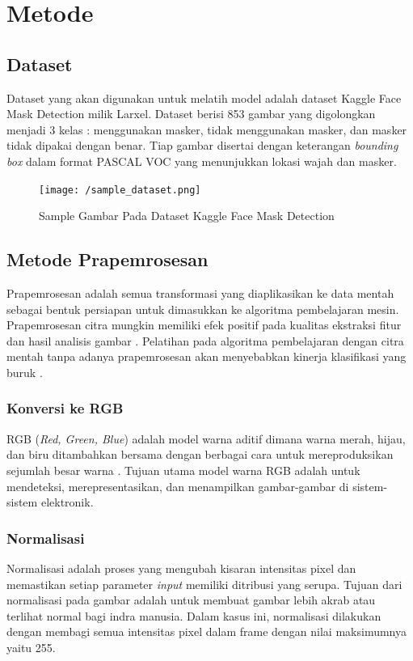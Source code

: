 \documentclass{article}
\begin{document}
  \section{Metode}
  	\subsection{Dataset}
  	Dataset yang akan digunakan untuk melatih model adalah dataset Kaggle Face Mask Detection milik Larxel\cite{larxel_2020}. Dataset berisi 853 gambar yang digolongkan menjadi 3 kelas : menggunakan masker, tidak menggunakan masker, dan masker tidak dipakai dengan benar. Tiap gambar disertai dengan keterangan \textit{bounding box} dalam format PASCAL VOC yang menunjukkan lokasi wajah dan masker. 
  	
  	\begin{figure}[H]
  		\centering
  		\texttt{[image: /sample\_dataset.png]}
  		\caption{Sample Gambar Pada Dataset Kaggle Face Mask Detection}
  	\end{figure} 
  	
  	\subsection{Metode Prapemrosesan}
  	Prapemrosesan adalah semua transformasi yang diaplikasikan ke data mentah sebagai bentuk persiapan untuk dimasukkan ke algoritma pembelajaran mesin. Prapemrosesan citra mungkin memiliki efek positif pada kualitas ekstraksi fitur dan hasil analisis gambar \cite{krig}. Pelatihan pada algoritma pembelajaran dengan citra mentah tanpa adanya prapemrosesan akan menyebabkan kinerja klasifikasi yang buruk \cite{pal}.
	  	\subsubsection{Konversi ke RGB}
	  	RGB (\textit{Red, Green, Blue}) adalah model warna aditif dimana warna merah, hijau, dan biru ditambahkan bersama dengan berbagai cara untuk mereproduksikan sejumlah besar warna \cite{robert}. Tujuan utama model warna RGB adalah untuk mendeteksi, merepresentasikan, dan menampilkan gambar-gambar di sistem-sistem elektronik.
	  	\subsubsection{Normalisasi}
	  	Normalisasi adalah proses yang mengubah kisaran intensitas pixel dan memastikan setiap parameter \textit{input} memiliki ditribusi yang serupa. 
	  	Tujuan dari normalisasi pada gambar adalah untuk membuat gambar lebih akrab atau terlihat normal bagi indra manusia. Dalam kasus ini, normalisasi dilakukan dengan membagi semua intensitas pixel dalam frame dengan nilai maksimumnya yaitu 255.
\end{document}
